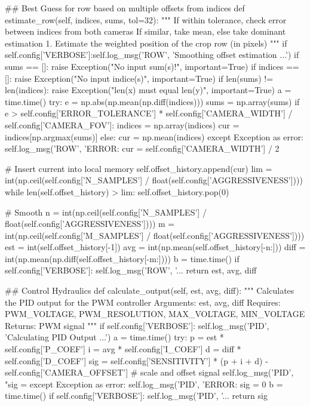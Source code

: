 \begin{python}
    ## Best Guess for row based on multiple offsets from indices
    def estimate_row(self, indices, sums, tol=32):
        """
        If within tolerance, check error between indices from both cameras
        If similar, take mean, else take dominant estimation
        1. Estimate the weighted position of the crop row (in pixels)
        """
        if self.config['VERBOSE']:self.log_msg('ROW', 'Smoothing offset estimation ...')
        if sums == []: raise Exception("No input sum(s)!", important=True)
        if indices == []: raise Exception("No input indice(s)", important=True)
        if len(sums) != len(indices): raise Exception("len(x) must equal len(y)", important=True)
        a = time.time()
        try:
            e = np.abs(np.mean(np.diff(indices)))
            sums = np.array(sums)
            if e > self.config['ERROR_TOLERANCE'] * self.config['CAMERA_WIDTH'] / self.config['CAMERA_FOV']:
                indices = np.array(indices)
                cur =  indices[np.argmax(sums)]
            else:
                cur = np.mean(indices)
        except Exception as error:
            self.log_msg('ROW', 'ERROR: %
            cur = self.config['CAMERA_WIDTH'] / 2

        # Insert current into local memory
        self.offset_history.append(cur)
        lim = int(np.ceil(self.config['N_SAMPLES'] / float(self.config['AGGRESSIVENESS'])))
        while len(self.offset_history) > lim:
            self.offset_history.pop(0)

        # Smooth
        n = int(np.ceil(self.config['N_SAMPLES'] / float(self.config['AGGRESSIVENESS'])))
        m = int(np.ceil(self.config['M_SAMPLES'] / float(self.config['AGGRESSIVENESS'])))
        est =  int(self.offset_history[-1])
        avg = int(np.mean(self.offset_history[-n:]))
        diff = int(np.mean(np.diff(self.offset_history[-m:])))
        b = time.time()
        if self.config['VERBOSE']: self.log_msg('ROW', '... %
        return est, avg, diff
         
    ## Control Hydraulics
    def calculate_output(self, est, avg, diff):
        """
        Calculates the PID output for the PWM controller
        Arguments: est, avg, diff
        Requires: PWM_VOLTAGE, PWM_RESOLUTION, MAX_VOLTAGE, MIN_VOLTAGE
        Returns: PWM signal
        """
        if self.config['VERBOSE']: self.log_msg('PID', 'Calculating PID Output ...')
        a = time.time()
        try:
            p = est * self.config['P_COEF']
            i = avg * self.config['I_COEF']
            d = diff  * self.config['D_COEF']
            sig = self.config['SENSITIVITY'] * (p + i + d) - self.config['CAMERA_OFFSET'] # scale and offset signal
            self.log_msg('PID', "sig = %
        except Exception as error:
            self.log_msg('PID', 'ERROR: %
            sig = 0
        b = time.time()
        if self.config['VERBOSE']: self.log_msg('PID', '... %
        return sig
    

\end{python}
